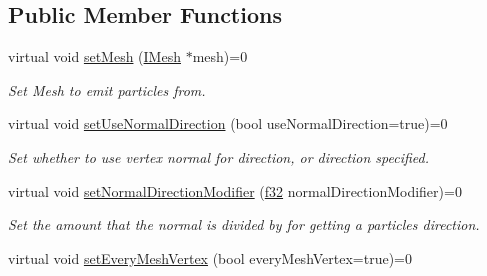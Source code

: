 \subsection*{Public Member Functions}
\begin{DoxyCompactItemize}
\item 
\mbox{\label{classirr_1_1scene_1_1IParticleMeshEmitter_ae4c0410bb93d6d8404c79953b4bcfde6}} 
virtual void \hyperlink{classirr_1_1scene_1_1IParticleMeshEmitter_ae4c0410bb93d6d8404c79953b4bcfde6}{set\+Mesh} (\hyperlink{classirr_1_1scene_1_1IMesh}{I\+Mesh} $\ast$mesh)=0
\begin{DoxyCompactList}\small\item\em Set Mesh to emit particles from. \end{DoxyCompactList}\item 
\mbox{\label{classirr_1_1scene_1_1IParticleMeshEmitter_abf450e804340f13771c58d6bbb1ba01f}} 
virtual void \hyperlink{classirr_1_1scene_1_1IParticleMeshEmitter_abf450e804340f13771c58d6bbb1ba01f}{set\+Use\+Normal\+Direction} (bool use\+Normal\+Direction=true)=0
\begin{DoxyCompactList}\small\item\em Set whether to use vertex normal for direction, or direction specified. \end{DoxyCompactList}\item 
\mbox{\label{classirr_1_1scene_1_1IParticleMeshEmitter_af07cce3784ce2b4968bd1808f0b6cfb9}} 
virtual void \hyperlink{classirr_1_1scene_1_1IParticleMeshEmitter_af07cce3784ce2b4968bd1808f0b6cfb9}{set\+Normal\+Direction\+Modifier} (\hyperlink{namespaceirr_a0277be98d67dc26ff93b1a6a1d086b07}{f32} normal\+Direction\+Modifier)=0
\begin{DoxyCompactList}\small\item\em Set the amount that the normal is divided by for getting a particles direction. \end{DoxyCompactList}\item 
\mbox{\label{classirr_1_1scene_1_1IParticleMeshEmitter_a1afad351c4d456ad61340f64afa1b7ae}} 
virtual void \hyperlink{classirr_1_1scene_1_1IParticleMeshEmitter_a1afad351c4d456ad61340f64afa1b7ae}{set\+Every\+Mesh\+Vertex} (bool every\+Mesh\+Vertex=true)=0

\end{DoxyCompactItemize}
